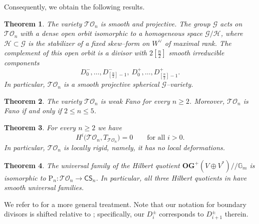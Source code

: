 \documentclass[10pt]{amsart}
\newtheorem{theorem}{Theorem}[section]
\theoremstyle{definition}
\newcommand{\CS}{\mathsf{CS}}
\newcommand{\TO}{\mathcal{TO}}
\newcommand{\PL}{\mathrm{P}}
\theoremstyle{plain} %
\begin{document}
Consequently, we obtain the following results. 

\begin{theorem}\label{othm:TLn-spherical}
The variety $\TO_n$ is smooth and projective. The group $\mathscr{G}$
acts on $\TO_n$ with a dense open orbit isomorphic to a homogeneous space $\mathscr{G}/\mathscr H$, where $\mathscr H\subset\mathscr G$ is the stabilizer of a fixed skew--form on $W^\vee$ of maximal rank. The complement of this open orbit is a divisor with $2[\frac{n}{2}]$ smooth irreducible components
\[
D_0^-,\dots,D_{[\frac{n}{2}]-1}^-,\ D_0^+,\dots,D_{[\frac{n}{2}]-1}^+.
\]
In particular, $\TO_n$ is a smooth projective spherical $\mathscr G$--variety.
\end{theorem}

\begin{theorem}\label{othm:Fano-weakFano}
The variety $\TO_n$ is weak Fano for every $n\ge 2$. Moreover, $\TO_n$ is Fano if
and only if $2\leq n\le 5$.
\end{theorem}


\begin{theorem}\label{othm:rigidity-absolute}
For every $n\ge 2$ we have
\[
H^i\bigl(\TO_n,T_{\TO_n}\bigr)=0\qquad\text{for all }i>0.
\]
In particular, $\TO_n$ is locally rigid, namely, it has no local deformations.
\end{theorem}

\begin{theorem}\label{all3}
The universal family of the Hilbert quotient $\mathbf{OG}^+(V \oplus V^*)\! /\!/\mathbb G_m$ is isomorphic to $\PL_n \colon \TO_n \rightarrow \CS_n$. In particular, all three Hilbert quotients in \cite{Th1} have smooth universal families.    
\end{theorem}

We refer to \cite{FMW} for a more general treatment. Note that our notation for boundary divisors is shifted relative to \cite{FMW}; specifically, our $D^{\pm}_{i}$ corresponds to $D^{\pm}_{i+1}$ therein.



\end{document}
